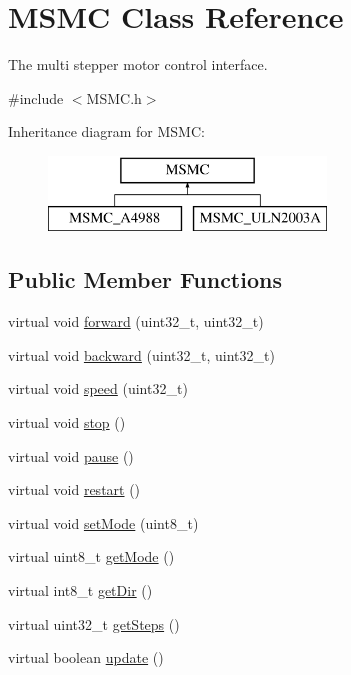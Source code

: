 \hypertarget{class_m_s_m_c}{\section{M\+S\+M\+C Class Reference}
\label{class_m_s_m_c}
}


The multi stepper motor control interface.  




{\ttfamily \#include $<$M\+S\+M\+C.\+h$>$}

Inheritance diagram for M\+S\+M\+C\+:\begin{figure}[H]
\begin{center}
\leavevmode
\includegraphics[height=2.000000cm]{class_m_s_m_c}
\end{center}
\end{figure}
\subsection*{Public Member Functions}
\begin{DoxyCompactItemize}
\item 
virtual void \hyperlink{class_m_s_m_c_a62615946a227d18ea3fc2f1329688d1f}{forward} (uint32\+\_\+t, uint32\+\_\+t)
\item 
virtual void \hyperlink{class_m_s_m_c_a389bfe7f7d05083cb4e95d73128c1c87}{backward} (uint32\+\_\+t, uint32\+\_\+t)
\item 
virtual void \hyperlink{class_m_s_m_c_a065e48c8e8f3b513bf6694e8eb1b28d5}{speed} (uint32\+\_\+t)
\item 
virtual void \hyperlink{class_m_s_m_c_a0b44d0a659550ba754bf9212294ba6d5}{stop} ()
\item 
virtual void \hyperlink{class_m_s_m_c_a9c45f1547467b43209c7a271604e7c85}{pause} ()
\item 
virtual void \hyperlink{class_m_s_m_c_ae09c870a71121c7cc9f060b6299a425b}{restart} ()
\item 
virtual void \hyperlink{class_m_s_m_c_a85bd4abf542aecdf24bb90b9ea2a47e9}{set\+Mode} (uint8\+\_\+t)
\item 
virtual uint8\+\_\+t \hyperlink{class_m_s_m_c_a5a1c4ee3498360946cc8e8d39436d0e3}{get\+Mode} ()
\item 
virtual int8\+\_\+t \hyperlink{class_m_s_m_c_a97ba8d296c68e2bb2a3b3eebe047dca8}{get\+Dir} ()
\item 
virtual uint32\+\_\+t \hyperlink{class_m_s_m_c_a365b393eba0c9d7d42e37d32db6c00b7}{get\+Steps} ()
\item 
virtual boolean \hyperlink{class_m_s_m_c_a2c379d628edbca2d36e3588b39bf6b98}{update} ()
\end{DoxyCompactItemize}


